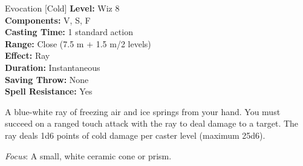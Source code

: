 {Evocation [Cold]}
{
	\textbf{Level:}
	Wiz 8\\
	\textbf{Components:}
	V, S, F\\
	\textbf{Casting Time:}
	1 standard action\\
	\textbf{Range:}
	Close (7.5 m + 1.5 m/2 levels)\\
	\textbf{Effect:}
	Ray\\
	\textbf{Duration:}
	Instantaneous\\
	\textbf{Saving Throw:}
	None\\
	\textbf{Spell Resistance:}
	Yes\\
}
{
	A blue-white ray of freezing air and ice springs from your hand. You must succeed on a ranged touch attack with the ray to deal damage to a target. The ray deals 1d6 points of cold damage per caster level (maximum 25d6).

	\textit{Focus}:
	A small, white ceramic cone or prism.

}
